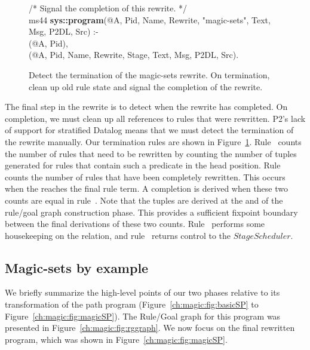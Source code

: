 \begin{figure}[!t]
\begin{boxedminipage}{\linewidth}
/* Signal the completion of this rewrite. */ \\
ms44 {\bf sys::program}(@A, Pid, Name, Rewrite, "magic-sets", Text, Msg, P2DL, Src) :- \\
(@A, Pid), \\
(@A, Pid, Name, Rewrite, Stage, Text, Msg, P2DL, Src).

\end{boxedminipage}
\caption{\label{ch:magic:fig:rewrite10} Detect the termination of the magic-sets rewrite. 
On termination, clean up old rule state and signal the completion of the rewrite.}
\end{figure}

The final step in the rewrite is to detect when the rewrite has completed.  On
completion, we must clean up all references to rules that were rewritten.  P2's
lack of support for stratified Datalog means that we must detect the
termination of the rewrite manually.  Our termination rules are shown in
Figure~\ref{ch:magic:fig:rewrite10}.  Rule~ counts the number of rules
that need to be rewritten by counting the number of  tuples
generated for rules that contain such a predicate in the head position.
Rule~ counts the number of rules that have been completely rewritten.
This occurs when the  reaches the final rule term.  A
completion is derived when these two counts are equal in rule~.
Note that the  tuples are derived at the and of the
rule/goal graph construction phase.  This provides a sufficient fixpoint
boundary between the final derivations of these two counts.  Rule~
performs some housekeeping on the  relation, and rule~
returns control to the $StageScheduler$.

\subsection{Magic-sets by example}

We briefly summarize the high-level points of our two phases relative to its
transformation of the path program (Figure~\ref{ch:magic:fig:basicSP} to
Figure~\ref{ch:magic:fig:magicSP}).  The Rule/Goal graph for this program was
presented in Figure~\ref{ch:magic:fig:rggraph}.  We now focus on the final
rewritten program, which was shown in Figure~\ref{ch:magic:fig:magicSP}.

